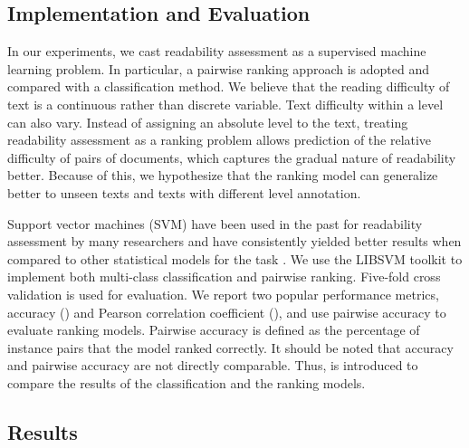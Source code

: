 \documentclass[11pt,letterpaper]{article}
\begin{document}
\subsection{Implementation and Evaluation}

     In our experiments, we cast readability assessment as a supervised machine learning problem. In particular, a pairwise ranking approach is adopted and compared with a classification method. We believe that the reading difficulty of text is a continuous rather than discrete variable. Text difficulty within a level can also vary. Instead of assigning an absolute level to the text, treating readability assessment as a ranking problem allows prediction of the relative difficulty of pairs of documents, which captures the gradual nature of readability better. Because of this, we hypothesize that the ranking model can generalize better to unseen texts and texts with different level annotation.

    Support vector machines (SVM) have been used in the past for readability assessment by many researchers and have consistently yielded better results when compared to other statistical models for the task \cite{kate2010learning}. We use the LIBSVM toolkit \cite{chang2011libsvm} to implement both multi-class classification and pairwise ranking. Five-fold cross validation is used for evaluation. We report two popular performance metrics, accuracy () and Pearson correlation coefficient (), and use pairwise accuracy to evaluate ranking models. Pairwise accuracy is defined as the percentage of instance pairs that the model ranked correctly. It should be noted that accuracy and pairwise accuracy are not directly comparable. Thus,  is introduced to compare the results of the classification and the ranking models.


\subsection{Results}
\end{document}
